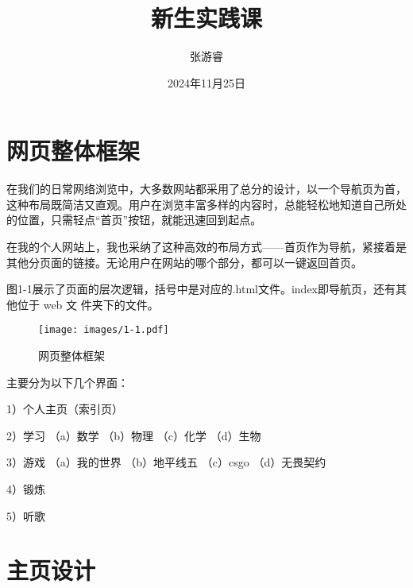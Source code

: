 \documentclass[supercite]{Experimental_Report}
\title{~~~~~~新生实践课~~~~~~}
\author{张游睿}
\date{2024年11月25日}
\theoremstyle{definition}
\begin{document}
\maketitle

\clearpage


\tableofcontents[level=2]

\clearpage


\section{网页整体框架}

在我们的日常网络浏览中，大多数网站都采用了总分的设计，以一个导航页为首，这种布局既简洁又直观。用户在浏览丰富多样的内容时，总能轻松地知道自己所处的位置，只需轻点“首页”按钮，就能迅速回到起点。

在我的个人网站上，我也采纳了这种高效的布局方式——首页作为导航，紧接着是其他分页面的链接。无论用户在网站的哪个部分，都可以一键返回首页。

图1-1展示了页面的层次逻辑，括号中是对应的.html文件。index即导航页，还有其他位于 web 文
件夹下的文件。

\begin{figure}[htb] %
	\begin{center}
		\texttt{[image: images/1-1.pdf]}
		\caption{网页整体框架}
		\label{fig1-1}
	\end{center}
\end{figure}

主要分为以下几个界面：

1）个人主页（索引页）

2）学习 （a）数学 （b）物理 （c）化学 （d）生物

3）游戏 （a）我的世界  （b）地平线五 （c）csgo （d）无畏契约

4）锻炼

5）听歌


\newpage

\section{主页设计}
\end{document}
